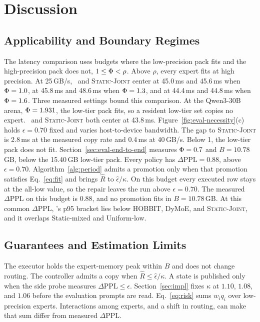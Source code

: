 \section{Discussion}
\label{sec:discussion}

\subsection{Applicability and Boundary Regimes}
\label{sec:falsify}

The latency comparison uses budgets where the low-precision pack fits and the high-precision pack does not, \(1\le\Phi<\rho\).
Above \(\rho\), every expert fits at high precision.
At 25\,GB/s, \systemname\ and \textsc{Static-Joint} center at 45.0\,ms and 45.6\,ms when \(\Phi=1.0\), at 45.8\,ms and 48.6\,ms when \(\Phi=1.3\), and at 44.4\,ms and 44.8\,ms when \(\Phi=1.6\).
Three measured settings bound this comparison.
At the Qwen3-30B arena, \(\Phi=1.931\), the low-tier pack fits, so a resident low-tier set copies no expert. \systemname\ and \textsc{Static-Joint} both center at 43.8\,ms.
Figure~\ref{fig:eval-necessity}(c) holds \(\epsilon=0.70\) fixed and varies host-to-device bandwidth. The gap to \textsc{Static-Joint} is 2.8\,ms at the measured copy rate and 0.4\,ms at 40\,GB/s.
Below 1, the low-tier pack does not fit. Section~\ref{sec:eval-end-to-end} measures \(\Phi=0.7\) and \(B=10.78\)\,GB, below the 15.40\,GB low-tier pack. Every policy has \(\Delta\mathrm{PPL}=0.88\), above \(\epsilon=0.70\).
Algorithm~\ref{alg:period} admits a promotion only when that promotion satisfies Eq.~\eqref{eq:fit} and brings \(\widehat R\) to \(\widehat\epsilon/\kappa\). On this budget every executed row stays at the all-low value, so the repair leaves the run above \(\epsilon=0.70\). The measured \(\Delta\mathrm{PPL}\) on this budget is 0.88, and no promotion fits in \(B=10.78\)\,GB. At this common \(\Delta\mathrm{PPL}\), \systemname's p95 bracket lies below HOBBIT, DyMoE, and \textsc{Static-Joint}, and it overlaps Static-mixed and Uniform-low.

\subsection{Guarantees and Estimation Limits}
\label{sec:quality-boundary}

The executor holds the expert-memory peak within \(B\) and does not change routing.
The controller admits a copy when \(\widehat R\le\widehat\epsilon/\kappa\).
A state is published only when the side probe measures \(\Delta\mathrm{PPL}\le\epsilon\).
Section~\ref{sec:impl} fixes \(\kappa\) at \(1.10\), \(1.08\), and \(1.06\) before the evaluation prompts are read.
Eq.~\eqref{eq:risk} sums \(w_iq_i\) over low-precision experts.
Interactions among experts, and a shift in routing, can make that sum differ from measured \(\Delta\mathrm{PPL}\).

